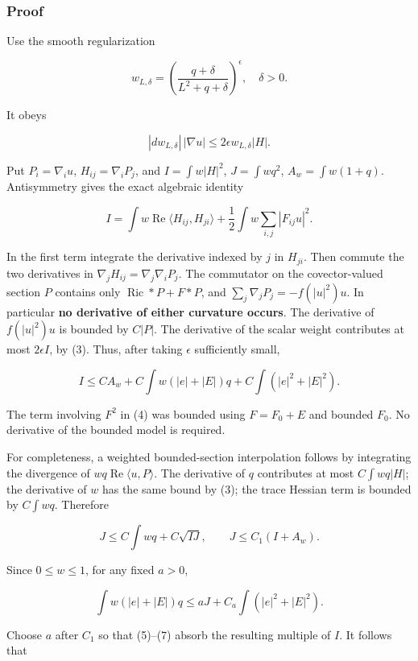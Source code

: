 \documentclass[11pt]{article}
\begin{document}
\hypertarget{proof}{%
\subsubsection{Proof}\label{proof}}

Use the smooth regularization

\[
 w_{L,\delta}=\left(\frac{q+\delta}{L^2+q+\delta}\right)^\epsilon,
 \quad \delta>0.
\]

It obeys

\[
 |dw_{L,\delta}|\,|\nabla u|\le2\epsilon w_{L,\delta}|H|.
\tag{3}
\]

Put \(P_i=\nabla_i u\), \(H_{ij}=\nabla_iP_j\), and \(I=\int w|H|^2\),
\(J=\int wq^2\), \(A_w=\int w(1+q)\). Antisymmetry gives the exact
algebraic identity

\[
 I=\int w\operatorname{Re}\langle H_{ij},H_{ji}\rangle
       +\frac12\int w\sum_{i,j}|F_{ij}u|^2.
\tag{4}
\]

In the first term integrate the derivative indexed by \(j\) in
\(H_{ji}\). Then commute the two derivatives in
\(\nabla_jH_{ij}=\nabla_j\nabla_iP_j\). The commutator on the
covector-valued section \(P\) contains only
\(\operatorname{Ric}*P+F*P\), and \(\sum_j\nabla_jP_j=-f(|u|^2)u\). In
particular \textbf{no derivative of either curvature occurs}. The
derivative of \(f(|u|^2)u\) is bounded by \(C|P|\). The derivative of
the scalar weight contributes at most \(2\epsilon I\), by (3). Thus,
after taking \(\epsilon\) sufficiently small,

\[
 I\le C A_w+C\int w(|e|+|E|)q+C\int (|e|^2+|E|^2).
\tag{5}
\]

The term involving \(F^2\) in (4) was bounded using \(F=F_0+E\) and
bounded \(F_0\). No derivative of the bounded model is required.

For completeness, a weighted bounded-section interpolation follows by
integrating the divergence of \(wq\operatorname{Re}\langle u,P\rangle\).
The derivative of \(q\) contributes at most \(C\int wq|H|\); the
derivative of \(w\) has the same bound by (3); the trace Hessian term is
bounded by \(C\int wq\). Therefore

\[
 J\le C\int wq+C\sqrt{IJ},\qquad
 J\le C_1(I+A_w).\tag{6}
\]

Since \(0\le w\le1\), for any fixed \(a>0\),

\[
 \int w(|e|+|E|)q
 \le aJ+C_a\int(|e|^2+|E|^2).
\tag{7}
\]

Choose \(a\) after \(C_1\) so that (5)--(7) absorb the resulting
multiple of \(I\). It follows that
\end{document}
